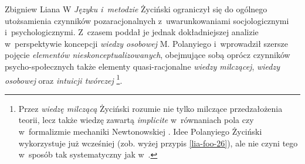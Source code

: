 \begin{artplenv}{Zbigniew Liana}
W \textit{Języku i~metodzie} Życiński ograniczył się do ogólnego utożsamienia czynników pozaracjonalnych z~uwarunkowaniami
socjologicznymi i~psychologicznymi. Z~czasem poddał je jednak dokładniejszej analizie w~perspektywie koncepcji
\textit{wiedzy osobowej} M. Pola\-nyiego %
i~wprowadził szersze pojęcie \textit{elementów nieskonceptualizowanych}, obejmujące
sobą oprócz czynników psycho-społecznych także elementy quasi-racjonalne \textit{wiedzy milczącej}, \textit{wiedzy osobowej}
oraz \textit{intuicji twórczej}
\parencite[zob.][s.~179–191]{zycinski_elementy_1996}\footnote{Przez
\textit{wiedzę milczącą} Życiński rozumie nie tylko milczące przedzałożenia teorii, lecz także wiedzę zawartą
\textit{implicite} w~równaniach pola czy w~formalizmie mechaniki Newtonowskiej
\parencite[zob.][s.~189]{zycinski_elementy_1996}.
Idee Polanyiego Życiński wykorzystuje już wcześniej (zob. wyżej przypis \ref{lia-foo-26}), ale nie czyni
tego w~sposób tak systematyczny jak w~\parencite*{zycinski_elementy_1996}.}.


\end{artplenv}
